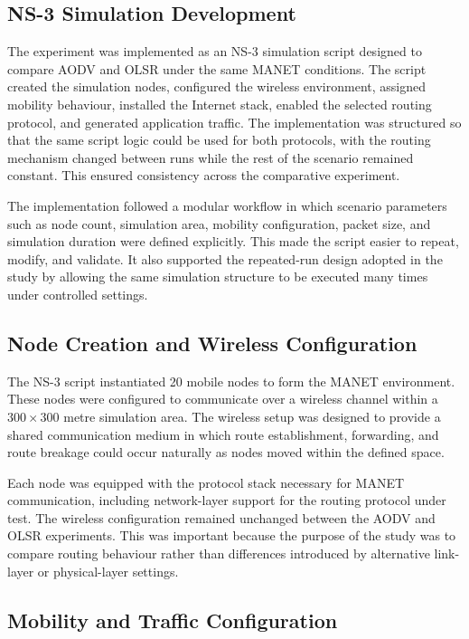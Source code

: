 \documentclass{Academic}
\begin{document}
\subsection{NS-3 Simulation Development}

The experiment was implemented as an NS-3 simulation script designed to compare AODV and OLSR under the same MANET conditions. The script created the simulation nodes, configured the wireless environment, assigned mobility behaviour, installed the Internet stack, enabled the selected routing protocol, and generated application traffic. The implementation was structured so that the same script logic could be used for both protocols, with the routing mechanism changed between runs while the rest of the scenario remained constant. This ensured consistency across the comparative experiment.

The implementation followed a modular workflow in which scenario parameters such as node count, simulation area, mobility configuration, packet size, and simulation duration were defined explicitly. This made the script easier to repeat, modify, and validate. It also supported the repeated-run design adopted in the study by allowing the same simulation structure to be executed many times under controlled settings.

\subsection{Node Creation and Wireless Configuration}

The NS-3 script instantiated 20 mobile nodes to form the MANET environment. These nodes were configured to communicate over a wireless channel within a \(300 \times 300\) metre simulation area. The wireless setup was designed to provide a shared communication medium in which route establishment, forwarding, and route breakage could occur naturally as nodes moved within the defined space.

Each node was equipped with the protocol stack necessary for MANET communication, including network-layer support for the routing protocol under test. The wireless configuration remained unchanged between the AODV and OLSR experiments. This was important because the purpose of the study was to compare routing behaviour rather than differences introduced by alternative link-layer or physical-layer settings.

\subsection{Mobility and Traffic Configuration}
\end{document}

